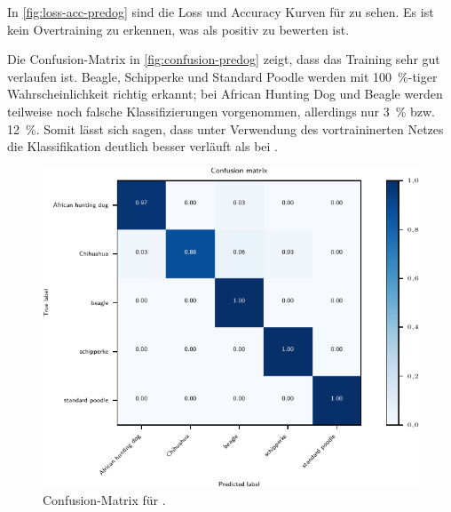 In \autoref{fig:loss-acc-predog} sind die Loss und Accuracy Kurven für \PreDog{} zu sehen.
Es ist kein Overtraining zu erkennen, was als positiv zu bewerten ist.

Die Confusion-Matrix in \autoref{fig:confusion-predog} zeigt, dass das Training sehr gut
verlaufen ist. Beagle, Schipperke und Standard Poodle werden mit \SI{100}{\percent}-tiger
Wahrscheinlichkeit richtig erkannt; bei African Hunting Dog und Beagle werden teilweise
noch falsche Klassifizierungen vorgenommen, allerdings nur \SI{3}{\percent} bzw.
\SI{12}{\percent}. Somit lässt sich sagen, dass unter Verwendung des vortraininerten
Netzes die Klassifikation deutlich besser verläuft als bei \MiniDog{}.

\begin{figure}
  \centering
  \includegraphics[scale=0.8]{pics/ergebnisse/PreDogNN/confusion_matrix.pdf}
  \caption{Confusion-Matrix für \PreDog{}.}
  \label{fig:confusion-predog}
\end{figure}

\subsection{\RF}

